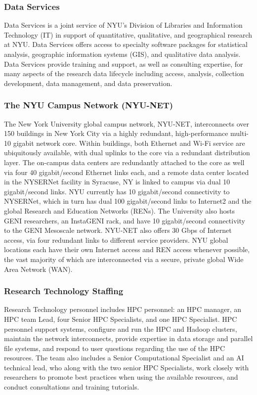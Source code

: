 \subsubsection*{Data Services }
Data Services is a joint service of NYU's Division of Libraries and Information Technology (IT) in support of quantitative, qualitative, and geographical research at NYU. Data Services offers access to specialty software packages for statistical analysis, geographic information systems (GIS), and qualitative data analysis. Data Services provide training and support, as well as consulting expertise, for many aspects of the research data lifecycle including access, analysis, collection development, data management, and data preservation.

\subsubsection*{The NYU Campus Network (NYU-NET)}
The New York University global campus network, NYU-NET, interconnects over 150 buildings in New York City via a highly redundant, high-performance multi-10 gigabit network core.  Within buildings, both Ethernet and Wi-Fi service are ubiquitously available, with dual uplinks to the core via a redundant distribution layer.  The on-campus data centers are redundantly attached to the core as well via four 40 gigabit/second Ethernet links each, and a remote data center located in the NYSERNet facility in Syracuse, NY is linked to campus via dual 10 gigabit/second links.  NYU currently has 10 gigabit/second connectivity to NYSERNet, which in turn has dual 100 gigabit/second links to Internet2 and the global Research and Education Networks (RENs).  The University also hosts GENI researchers, an InstaGENI rack, and have 10 gigabit/second connectivity to the GENI Mesoscale network. NYU-NET also offers 30 Gbps of Internet access, via four redundant links to different service providers. NYU global locations each have their own Internet access and REN access whenever possible, the vast majority of which are interconnected via a secure, private global Wide Area Network (WAN).

\subsubsection*{Research Technology Staffing}
Research Technology personnel includes HPC personnel: an HPC manager, an HPC team Lead, four Senior HPC Specialists, and one HPC Specialist. HPC personnel support systems, configure and run the HPC and Hadoop clusters, maintain the network interconnects, provide expertise in data storage and parallel file systems, and respond to user questions regarding the use of the HPC resources. The team also includes a Senior Computational Specialist and an AI technical lead, who along with the two senior HPC Specialists, work closely with researchers to promote best practices when using the available resources, and conduct consultations and training tutorials.

